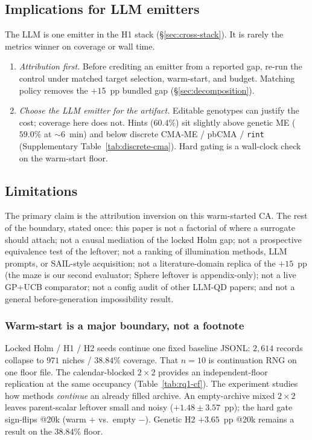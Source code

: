 \documentclass[preprint,12pt]{elsarticle}
\begin{document}
\subsection{Implications for LLM emitters}
\label{sec:when-llm}

The LLM is one emitter in the H1 stack (\S\ref{sec:cross-stack}). It is rarely the metrics winner on coverage or wall time.

\begin{enumerate}
  \item \emph{Attribution first.} Before crediting an emitter from a reported gap, re-run the control under matched target selection, warm-start, and budget. Matching policy removes the $+15$~pp bundled gap (\S\ref{sec:decomposition}).
  \item \emph{Choose the LLM emitter for the artifact.} Editable genotypes can justify the cost; coverage here does not. Hints ($60.4\%$) sit slightly above genetic ME ($59.0\%$ at ${\sim}6$~min) and below discrete CMA-ME / pbCMA / \texttt{rint} (Supplementary Table~\ref{tab:discrete-cma}). Hard gating is a wall-clock check on the warm-start floor.
\end{enumerate}

\subsection{Limitations}
\label{sec:limitations}

The primary claim is the attribution inversion on this warm-started CA. The rest of the boundary, stated once: this paper is not a factorial of where a surrogate should attach; not a causal mediation of the locked Holm gap; not a prospective equivalence test of the leftover; not a ranking of illumination methods, LLM prompts, or SAIL-style acquisition; not a literature-domain replica of the $+15$~pp (the maze is our second evaluator; Sphere leftover is appendix-only); not a live GP+UCB comparator; not a config audit of other LLM-QD papers; and not a general before-generation impossibility result.

\subsubsection{Warm-start is a major boundary, not a footnote}
\label{sec:warm-start-limit}
\label{sec:bootstrap-hyp}

Locked Holm / H1 / H2 seeds continue one fixed baseline JSONL: $2{,}614$ records collapse to $971$ niches / $38.84\%$ coverage. That $n{=}10$ is continuation RNG on one floor file. The calendar-blocked $2\times2$ provides an independent-floor replication at the same occupancy (Table~\ref{tab:rq1-cf}). The experiment studies how methods \emph{continue} an already filled archive. An empty-archive mixed $2\times2$ leaves parent-scalar leftover small and noisy ($+1.48\pm3.57$~pp); the hard gate sign-flips @20k (warm $+$ vs.\ empty $-$). Genetic H2 $+3.65$~pp @20k remains a result on the $38.84\%$ floor.
\end{document}
